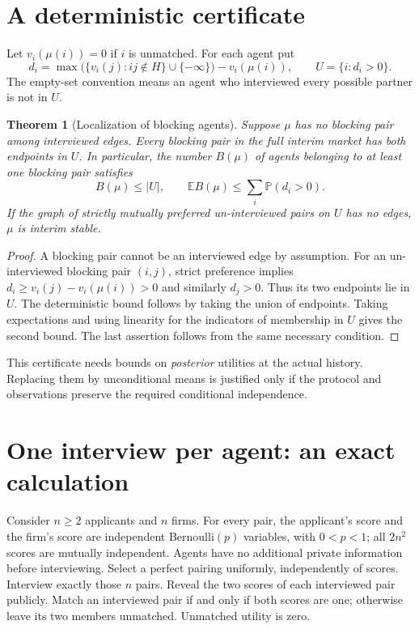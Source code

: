 \documentclass[11pt,a4paper]{article}
\newtheorem{theorem}{Theorem}[section]
\theoremstyle{definition}
\theoremstyle{remark}
\newcommand{\E}{\mathbb{E}}
\newcommand{\Prob}{\mathbb{P}}
\begin{document}
\section{A deterministic certificate}
Let $v_i(\mu(i))=0$ if $i$ is unmatched. For each agent put
\[
 d_i=\max\bigl(\{v_i(j):ij\notin H\}\cup\{-\infty\}\bigr)
                -v_i(\mu(i)),\qquad U=\{i:d_i>0\}.
\]
The empty-set convention means an agent who interviewed every possible partner is not in $U$.
\begin{theorem}[Localization of blocking agents]
Suppose $\mu$ has no blocking pair among interviewed edges. Every blocking pair in the full interim market has both endpoints in $U$. In particular, the number $B(\mu)$ of agents belonging to at least one blocking pair satisfies
\[
 B(\mu)\le |U|,\qquad
 \E B(\mu)\le\sum_i\Prob(d_i>0).
\]
If the graph of strictly mutually preferred un-interviewed pairs on $U$ has no edges, $\mu$ is interim stable.
\end{theorem}
\begin{proof}
A blocking pair cannot be an interviewed edge by assumption. For an un-interviewed blocking pair $(i,j)$, strict preference implies
$d_i\ge v_i(j)-v_i(\mu(i))>0$ and similarly $d_j>0$. Thus its two endpoints lie in $U$. The deterministic bound follows by taking the union of endpoints. Taking expectations and using linearity for the indicators of membership in $U$ gives the second bound. The last assertion follows from the same necessary condition.
\end{proof}
This certificate needs bounds on \emph{posterior} utilities at the actual history. Replacing them by unconditional means is justified only if the protocol and observations preserve the required conditional independence.
\section{One interview per agent: an exact calculation}
Consider $n\ge2$ applicants and $n$ firms. For every pair, the applicant's score and the firm's score are independent Bernoulli$(p)$ variables, with $0<p<1$; all $2n^2$ scores are mutually independent. Agents have no additional private information before interviewing. Select a perfect pairing uniformly, independently of scores. Interview exactly those $n$ pairs. Reveal the two scores of each interviewed pair publicly. Match an interviewed pair if and only if both scores are one; otherwise leave its two members unmatched. Unmatched utility is zero.
\end{document}
